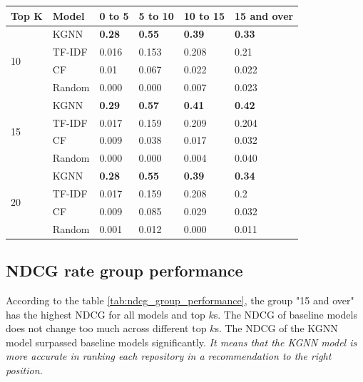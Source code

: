 \documentclass[11pt,twoside]{report}
\begin{document}
\begin{center}
    \begin{tabular}{l | l | l | l | l | l}
    \hline
    Top K & Model & 0 to 5 & 5 to 10 & 10 to 15 & 15 and over \\
    \hline
    \multirow{4}{*}{10} 
    & KGNN & \textbf{0.28} & \textbf{0.55} & \textbf{0.39} & \textbf{0.33} \\
    & TF-IDF & 0.016 & 0.153 & 0.208 & 0.21 \\
    & CF & 0.01 & 0.067 & 0.022 & 0.022 \\
    & Random & 0.000 & 0.000 & 0.007 & 0.023 \\
    \hline
    \multirow{4}{*}{15}
    & KGNN & \textbf{0.29} & \textbf{0.57} & \textbf{0.41} & \textbf{0.42} \\
    & TF-IDF & 0.017 & 0.159 & 0.209 & 0.204 \\
    & CF & 0.009 & 0.038 & 0.017 & 0.032 \\
    & Random & 0.000 & 0.000 & 0.004 & 0.040 \\
    \hline
    \multirow{4}{*}{20}
    & KGNN & \textbf{0.28} & \textbf{0.55} & \textbf{0.39} & \textbf{0.34} \\
    & TF-IDF & 0.017 & 0.159 & 0.208 & 0.2 \\
    & CF & 0.009 & 0.085 & 0.029 & 0.032 \\
    & Random & 0.001 & 0.012 & 0.000 & 0.011 \\
    \end{tabular}
    \label{tab:mrr_group_performance}
\end{center}

\subsection{NDCG rate group performance}
According to the table \ref{tab:ndcg_group_performance}, the group "15 and over" has the highest NDCG for all models and top $k$s. The NDCG of baseline models does not change too much across different top $k$s. The NDCG of the KGNN model surpassed baseline models significantly. \textit{It means that the KGNN model is more accurate in ranking each repository in a recommendation to the right position.}
\end{document}
